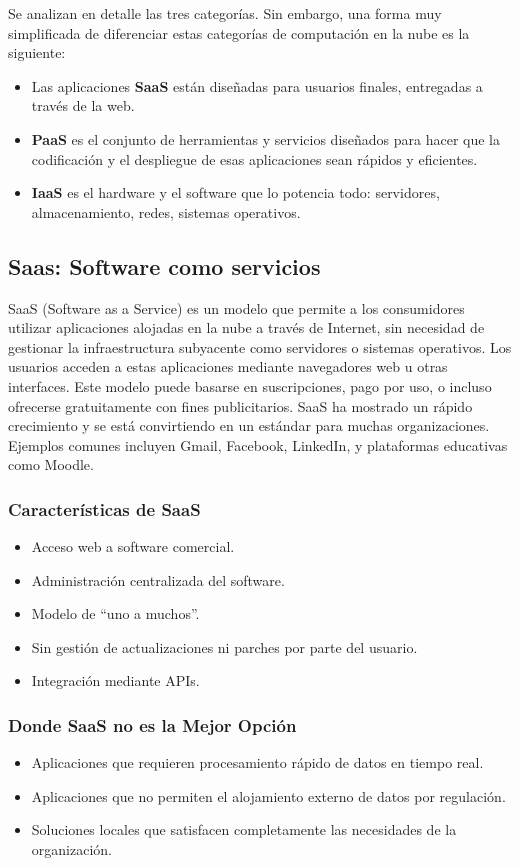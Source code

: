 \documentclass{article}
\begin{document}
\text{} Se analizan en detalle las tres categorías. Sin embargo, una forma muy simplificada de diferenciar estas categorías de computación en la nube es la siguiente:
\begin{itemize}
    \item Las aplicaciones \textbf{SaaS} están diseñadas para usuarios finales, entregadas a través de la web.
    \item \textbf{PaaS} es el conjunto de herramientas y servicios diseñados para hacer que la codificación y el despliegue de esas aplicaciones sean rápidos y eficientes.
    \item \textbf{IaaS} es el hardware y el software que lo potencia todo: servidores, almacenamiento, redes, sistemas operativos.
\end{itemize}


\subsection{Saas: Software como servicios}

SaaS (Software as a Service) es un modelo que permite a los consumidores utilizar aplicaciones alojadas en la nube a través de Internet, sin necesidad de gestionar la infraestructura subyacente como servidores o sistemas operativos. Los usuarios acceden a estas aplicaciones mediante navegadores web u otras interfaces. Este modelo puede basarse en suscripciones, pago por uso, o incluso ofrecerse gratuitamente con fines publicitarios. SaaS ha mostrado un rápido crecimiento y se está convirtiendo en un estándar para muchas organizaciones. Ejemplos comunes incluyen Gmail, Facebook, LinkedIn, y plataformas educativas como Moodle.

\subsubsection*{Características de SaaS}
\begin{itemize}
    \item Acceso web a software comercial.
    \item Administración centralizada del software.
    \item Modelo de “uno a muchos”.
    \item Sin gestión de actualizaciones ni parches por parte del usuario.
    \item Integración mediante APIs.
\end{itemize}

\subsubsection*{Donde SaaS no es la Mejor Opción}
\begin{itemize}
    \item Aplicaciones que requieren procesamiento rápido de datos en tiempo real.
    \item Aplicaciones que no permiten el alojamiento externo de datos por regulación.
    \item Soluciones locales que satisfacen completamente las necesidades de la organización.
\end{itemize}
\end{document}
